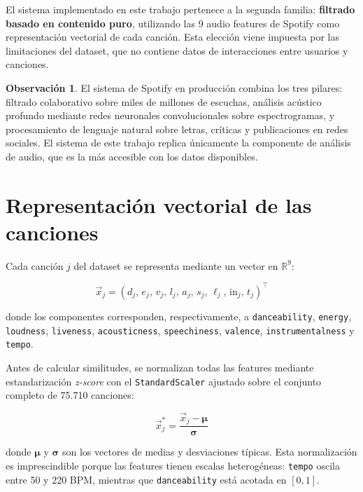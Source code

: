 \documentclass[12pt, a4paper]{book}
\theoremstyle{definition}
\newtheorem{observacion}{Observación}[chapter]
\begin{document}
El sistema implementado en este trabajo pertenece a la segunda familia:
\textbf{filtrado basado en contenido puro}, utilizando las 9 audio features
de Spotify como representación vectorial de cada canción. Esta elección viene
impuesta por las limitaciones del dataset, que no contiene datos de
interacciones entre usuarios y canciones.

\begin{observacion}
El sistema de Spotify en producción combina los tres pilares: filtrado
colaborativo sobre miles de millones de escuchas, análisis acústico profundo
mediante redes neuronales convolucionales sobre espectrogramas, y
procesamiento de lenguaje natural sobre letras, críticas y publicaciones en
redes sociales. El sistema de este trabajo replica únicamente la componente
de análisis de audio, que es la más accesible con los datos disponibles.
\end{observacion}

\section{Representación vectorial de las canciones}
\label{sec:representacion}

Cada canción $j$ del dataset se representa mediante un vector en
$\mathbb{R}^9$:

\begin{equation}
\label{eq:vector_cancion}
\vec{x}_j = (d_j,\, e_j,\, v_j,\, l_j,\, a_j,\, s_j,\, \ell_j,\,
             \text{in}_j,\, t_j)^\top
\end{equation}

donde los componentes corresponden, respectivamente, a
\texttt{danceability}, \texttt{energy}, \texttt{loudness},
\texttt{liveness}, \texttt{acousticness}, \texttt{speechiness},
\texttt{valence}, \texttt{instrumentalness} y \texttt{tempo}.

Antes de calcular similitudes, se normalizan todas las features mediante
estandarización \textit{z-score} con el \texttt{StandardScaler} ajustado
sobre el conjunto completo de 75.710 canciones:

\begin{equation}
\label{eq:zscore}
\vec{x}_j^* = \frac{\vec{x}_j - \boldsymbol{\mu}}{\boldsymbol{\sigma}}
\end{equation}

donde $\boldsymbol{\mu}$ y $\boldsymbol{\sigma}$ son los vectores de medias
y desviaciones típicas. Esta normalización es imprescindible porque las
features tienen escalas heterogéneas: \texttt{tempo} oscila entre 50 y
220 BPM, mientras que \texttt{danceability} está acotada en $[0, 1]$.
\end{document}

